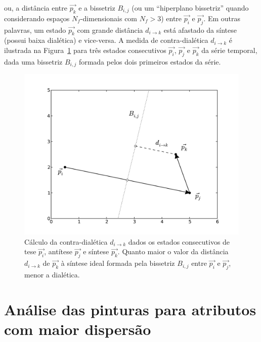 \noindent ou, a distância entre $\vec{p_k}$ e a bissetriz $B_{i,j}$
(ou um ``hiperplano bissetriz'' quando considerando espaços
$N_f$-dimensionais com $N_f>3$) entre $\vec{p_i}$ e $\vec{p_j}$. Em
outras palavras, um estado $\vec{p_k}$ com grande distância $d_{i
  \rightarrow k}$ está afastado da síntese (possui baixa dialética) e
vice-versa. A medida de contra-dialética $d_{i \rightarrow k}$ é
ilustrada na Figura~\ref{fig:desc_dialetica} para três estados
consecutivos $\vec{p_i}$, $\vec{p_j}$ e $\vec{p_k}$ da série temporal,
dada uma bissetriz $B_{i,j}$ formada pelos dois primeiros estados da
série.

\begin{figure}[ht!]
\begin{center}
        \includegraphics[scale=.6]{figs/desc_dialetica.pdf}
      \caption{Cálculo da contra-dialética $d_{i \rightarrow k}$ dados os
        estados consecutivos de tese $\vec{p_i}$, antítese $\vec{p_j}$ e síntese
        $\vec{p_k}$. Quanto maior o valor da distância $d_{i \rightarrow k}$ de
        $\vec{p_k}$ à síntese ideal formada pela bissetriz $B_{i,j}$ entre
        $\vec{p_i}$ e $\vec{p_j}$, menor a dialética.  }
        \label{fig:desc_dialetica}
\end{center}
\end{figure}


\section{Análise das pinturas para atributos com maior dispersão}
\label{sec:pares}

